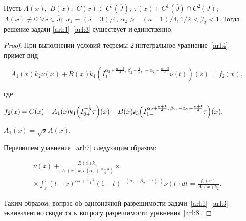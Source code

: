 \smallskip



\begin{theorem}[2]Пусть $A(x),$ $B(x),$ $C(x)\in C^1(\overline J);$ $\tau(x)\in C^1(\overline J)\cap C^2(J);$ $A(x)\neq 0$ $\forall x\in \overline{J};$ $\alpha_1=({a-3})/{4}$, $\alpha_2>-({a+1})/{4}$, $1/2<\beta_2<1.$ Тогда решение задачи \eqref{arl:1}--\eqref{arl:3} существует и единственно$.$


\end{theorem}



\smallskip



\begin{proof} При выполнении условий теоремы 2 интегральное уравнение~\eqref{arl:4} примет вид

\begin{equation}

A_1(x)k_2\nu(x)+B(x)k_4\left(I^{\alpha_2+\frac{a+3}{4},\,\beta_2-\frac 12,\,-\alpha_2-\frac{a+3}{4}}_{1-}\nu(t)\right)(x)=f_2(x),

\label{arl:7}

\end{equation}

где

$

f_2(x)=C(x)-A_1(x)k_1\Bigl(I^{-\frac 12}_{0+}\tau\Bigr)(x)-B(x)k_3\Bigl(I^{\alpha_2+\frac{a+1}{4},\,\beta_2,\,-\alpha_2-\frac{a+3}{4}}_{1-}\tau\Bigr)(x),

$

$A_1(x)=\sqrt{x}A(x)$.

Перепишем уравнение~\eqref{arl:7} следующим образом:

\begin{multline}

\nu(x)+\frac{B(x)k_4}{A_1(x)k_2\Gamma\left(\alpha_2+\frac{a+3}{4}\right)} \times \\ \times \int_{x}^{1}(t-x)^{\alpha_2+\frac{a-1}{4}}(1-t)^{-\left(\alpha_2+\beta_2+\frac{a+1}{4}\right)}\nu(t)dt=

\frac{f_2(x)}{A_1(x)k_2}.

\label{arl:8}

\end{multline}

Таким образом, вопрос об однозначной разрешимости задачи~\eqref{arl:1}--\eqref{arl:3} эквивалентно сводится к вопросу разрешимости уравнения~\eqref{arl:8}.




\end{proof}
